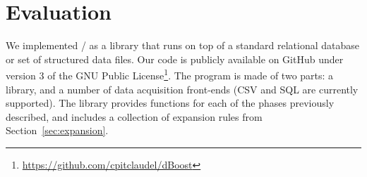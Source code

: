 \section{Evaluation}
\label{sec:evaluation}


We implemented \dBoost/ as a library that runs on top of a standard relational database or set of structured data files. Our code is publicly available on GitHub under version 3 of the GNU Public License\footnote{\url{https://github.com/cpitclaudel/dBoost}}. The program is made of two parts: a library, and a number of data acquisition front-ends (CSV and SQL are currently supported). The library provides functions for each of the phases previously described, and includes a collection of expansion rules from Section~\ref{sec:expansion}.


%

